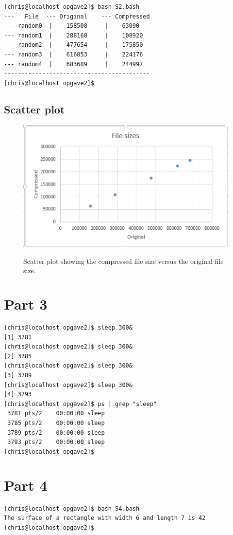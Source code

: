 \documentclass[12pt]{article}
\begin{document}
\begin{lstlisting}
[chris@localhost opgave2]$ bash S2.bash 
---   File  --- Original    --- Compressed
--- random0  |    158508     |    63090
--- random1  |    288168     |    108920
--- random2  |    477654     |    175850
--- random3  |    616853     |    224176
--- random4  |    683689     |    244997
------------------------------------------
[chris@localhost opgave2]$ 
\end{lstlisting}

\subsection{Scatter plot}
\begin{figure}[!h]
	\centering
	\includegraphics[width=0.5\linewidth]{file_size}
	\label{file_size}
	\caption{Scatter plot showing the compressed file size versus the original file size.}
\end{figure}

\section{Part 3}

\begin{lstlisting}
[chris@localhost opgave2]$ sleep 300&
[1] 3781
[chris@localhost opgave2]$ sleep 300&
[2] 3785
[chris@localhost opgave2]$ sleep 300&
[3] 3789
[chris@localhost opgave2]$ sleep 300&
[4] 3793
[chris@localhost opgave2]$ ps | grep "sleep"
 3781 pts/2    00:00:00 sleep
 3785 pts/2    00:00:00 sleep
 3789 pts/2    00:00:00 sleep
 3793 pts/2    00:00:00 sleep
[chris@localhost opgave2]$ 
\end{lstlisting}

\section{Part 4}

\begin{lstlisting}
[chris@localhost opgave2]$ bash S4.bash 
The surface of a rectangle with width 6 and length 7 is 42
[chris@localhost opgave2]$ 
\end{lstlisting}
\end{document}
